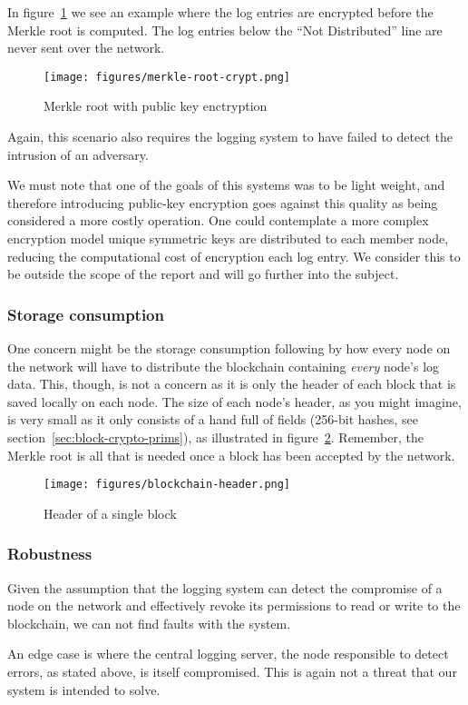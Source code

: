 In figure~\ref{fig:merkle-root-crypt} we see an example where the log
entries are encrypted before the Merkle root is computed. The log
entries below the ``Not Distributed'' line are never sent over the
network.

\begin{figure}
  \centering
  \texttt{[image: figures/merkle-root-crypt.png]}
  \caption{\label{fig:merkle-root-crypt} Merkle root with public key enctryption}
\end{figure}

Again, this scenario also requires the logging system to have failed
to detect the intrusion of an adversary.

We must note that one of the goals of this systems was to be light
weight, and therefore introducing public-key encryption goes against
this quality as being considered a more costly operation. One could
contemplate a more complex encryption model unique symmetric keys are
distributed to each member node, reducing the computational cost of
encryption each log entry. We consider this to be outside the scope of
the report and will go further into the subject.

\subsubsection{Storage consumption}
One concern might be the storage consumption following by how every
node on the network will have to distribute the blockchain containing
\textit{every} node's log data. This, though, is not a concern as it
is only the header of each block that is saved locally on each
node. The size of each node's header, as you might imagine, is very
small as it only consists of a hand full of fields (256-bit hashes,
see section~\ref{sec:block-crypto-prims}), as illustrated in
figure~\ref{fig:blockchain-header}. Remember, the Merkle root is all
that is needed once a block has been accepted by the network.

\begin{figure}[H]
  \centering
  \texttt{[image: figures/blockchain-header.png]}
  \caption{\label{fig:blockchain-header} Header of a single block}
\end{figure}


\subsubsection{Robustness}
Given the assumption that the logging system can detect the compromise
of a node on the network and effectively revoke its permissions to
read or write to the blockchain, we can not find faults with the
system.

An edge case is where the central logging server, the node responsible
to detect errors, as stated above, is itself compromised. This is
again not a threat that our system is intended to solve.

